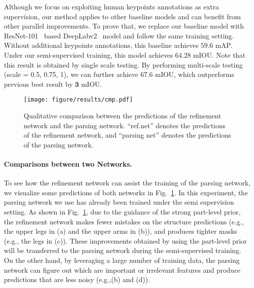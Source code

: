 \documentclass[10pt,twocolumn,letterpaper]{article}
\begin{document}
Although we focus on exploiting human keypoints annotations as extra supervision, our method applies to other baseline models and can benefit from other parallel improvements. To prove that, we replace our baseline model with ResNet-101~\cite{he2016deep} based DeepLabv2~\cite{chen2015deeplab} model and follow the same training setting. Without additional keypoints annotations, this baseline achieves $59.6$ mAP. Under our semi-supervised training, this model achieves $\mathbf{64.28}$ mIOU. Note that this result is obtained by single scale testing. By performing multi-scale testing (scale = {0.5, 0.75, 1}), we can further achieve $\mathbf{67.6}$ mIOU, which outperforms previous best result by $\mathbf{3}$ mIOU.

\begin{figure}[t]
\begin{center}
\texttt{[image: figure/results/cmp.pdf]}
\end{center}
\vspace{-4mm}
   \caption{Qualitative comparison between the predictions of the refinement network and the parsing network. ``ref.net'' denotes the predictions of the refinement network, and ``parsing net'' denotes the predictions of the parsing network.}
\label{fig:cmp}
\vspace{-5mm}
\end{figure}
\vspace{-5mm}
\paragraph{Comparisons between two Networks.}
To see how the refinement network can assist the training of the parsing network, we visualize some predictions of both networks in Fig.~\ref{fig:cmp}. In this experiment, the parsing network we use has already been trained under the semi supervision setting. As shown in Fig.~\ref{fig:cmp}, due to the guidance of the strong part-level prior, the refinement network makes fewer mistakes on the structure predictions (e.g., the upper legs in (a) and the upper arms in (b)), and produces tighter masks (e.g., the legs in (c)). These improvements obtained by using the part-level prior will be transferred to the parsing network during the semi-supervised training. On the other hand, by leveraging a large number of training data, the parsing network can figure out which are important or irrelevant features and produce predictions that are less noisy (e.g.,(b) and (d)).
\end{document}
